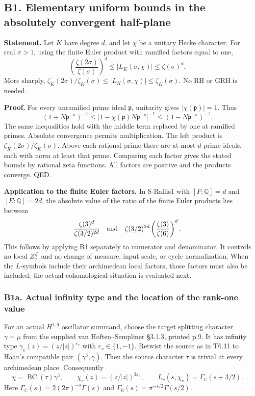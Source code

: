 \documentclass[11pt,a4paper]{article}
\theoremstyle{definition}
\begin{document}
\subsection{B1. Elementary uniform bounds in the absolutely convergent half-plane}\label{b1.-elementary-uniform-bounds-in-the-absolutely-convergent-half-plane}

\textbf{Statement.} Let \(K\) have degree \(d\), and let \(\chi\) be a unitary Hecke character. For real \(\sigma>1\), using the finite Euler product with ramified factors equal to one, \[
 \left(\frac{\zeta(2\sigma)}{\zeta(\sigma)}\right)^d
 \leq |L_K(\sigma,\chi)|\leq \zeta(\sigma)^d.
\] More sharply, \(\zeta_K(2\sigma)/\zeta_K(\sigma)\leq|L_K(\sigma,\chi)|\leq\zeta_K(\sigma)\). No RH or GRH is needed.

\textbf{Proof.} For every unramified prime ideal \(\mathfrak p\), unitarity gives \(|\chi(\mathfrak p)|=1\). Thus \[
 (1+N\mathfrak p^{-\sigma})^{-1}\leq
 |1-\chi(\mathfrak p)N\mathfrak p^{-\sigma}|^{-1}
 \leq(1-N\mathfrak p^{-\sigma})^{-1}.
\] The same inequalities hold with the middle term replaced by one at ramified primes. Absolute convergence permits multiplication. The left product is \(\zeta_K(2\sigma)/\zeta_K(\sigma)\). Above each rational prime there are at most \(d\) prime ideals, each with norm at least that prime. Comparing each factor gives the stated bounds by rational zeta functions. All factors are positive and the products converge. QED.

\textbf{Application to the finite Euler factors.} In S-Rallis1 with \([F:\mathbb Q]=d\) and \([E:\mathbb Q]=2d\), the absolute value of the ratio of the finite Euler products lies between \[
 \frac{\zeta(3)^d}{\zeta(3/2)^{2d}}
 \quad\hbox{and}\quad
 \zeta(3/2)^{2d}\left(\frac{\zeta(3)}{\zeta(6)}\right)^d.
\] This follows by applying B1 separately to numerator and denominator. It controls no local \(Z_v^\#\) and no change of measure, input scale, or cycle normalization. When the \(L\)-symbols include their archimedean local factors, those factors must also be included; the actual cohomological situation is evaluated next.

\subsubsection{B1a. Actual infinity type and the location of the rank-one value}\label{b1a.-actual-infinity-type-and-the-location-of-the-rank-one-value}

For an actual \(H^{1,0}\) oscillator summand, choose the target splitting character \(\gamma=\mu\) from the supplied van Hoften--Sempliner §3.1.3, printed p.9. It has infinity type \(\gamma_v(z)=(z/|z|)^{\varepsilon_v}\) with \(\varepsilon_v\in\{1,-1\}\). Retwist the source as in T6.11 to Haan's compatible pair \((\gamma^3,\gamma)\). Then the source character \(\tau\) is trivial at every archimedean place. Consequently \[
 \chi=\operatorname{BC}(\tau)\gamma^3,
 \qquad \chi_v(z)=(z/|z|)^{3\varepsilon_v},
 \qquad L_v(s,\chi_v)=\Gamma_{\mathbb C}(s+3/2).
\tag{B1a.1}
\] Here \(\Gamma_{\mathbb C}(s)=2(2\pi)^{-s}\Gamma(s)\) and \(\Gamma_{\mathbb R}(s)=\pi^{-s/2}\Gamma(s/2)\).
\end{document}
